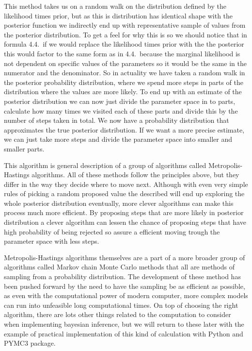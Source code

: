 \documentclass[12pt,a4paper,leqno]{report}
\theoremstyle{plain}
\theoremstyle{definition}
\theoremstyle{remark}
\begin{document}
This method takes us on a random walk on the distribution defined by the likelihood times
prior, but as this is distribution has identical shape with the posterior function we
indirectly end up with representative sample of values from the posterior distribution.
To get a feel for why this is so we should notice that in formula 4.4.\ if we would
replace the likelihood times prior with the the posterior this would factor to the same
form as in 4.4.\ because the marginal likelihood is not dependent on specific values of
the parameters so it would be the same in the numerator and the denominator. So in
actuality we have taken a random walk in the posterior probability distribution, where we
spend more steps in parts of the distribution where the values are more likely. To end up
with an estimate of the posterior distribution we can now just divide the parameter space
in to parts, calculate how many times we visited each of these parts and divide this by
the number of steps taken in total. We now have a probability distribution that
approximates the true posterior distribution. If we want a more precise estimate, we can
just take more steps and divide the parameter space into smaller and smaller parts.

This algorithm is general description of a group of algorithms called Metropolis-Hastings
algorithms. All of these methods follow the principles above, but they differ in the way
they decide where to move next. Although with even very simple rules of picking a random
proposed value the described will end up exploring the whole posterior distribution
eventually, more clever algorithms can make this process much more efficient. By
proposing steps that are more likely in posterior distribution a clever algorithm can
lessen the chance of proposing steps that have high probability of being rejected so
assure a efficient moving trough the parameter space with less steps.

Metropolis-Hastings algorithms themselves are a part of a more broader group of
algorithms called Markov chain Monte Carlo methods that all are methods of sampling from
a probability distribution. The development of these method has been pushed forward by
the need to have the sampling be as efficient as possible, as even with the computational
power of modern computer, more complex models can run into unfeasible long computational
times. On top of choosing the right algorithm, there are lots other things related to the
computation to consider when implementing bayesian inference, but we will return to these
later with the example of practical implementation of this kind of calculation with
Python and PYMC3 package.
\end{document}
